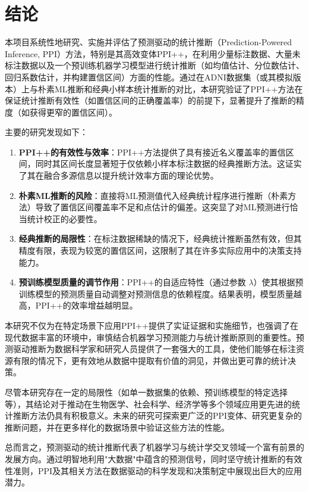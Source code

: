 \documentclass[12pt,a4paper]{article}
\begin{document}
\section{结论}
\label{sec:conclusion}
本项目系统性地研究、实施并评估了预测驱动的统计推断（Prediction-Powered Inference, PPI）方法，特别是其高效变体PPI++，在利用少量标注数据、大量未标注数据以及一个预训练机器学习模型进行统计推断（如均值估计、分位数估计、回归系数估计，并构建置信区间）方面的性能。通过在ADNI数据集（或其模拟版本）上与朴素ML推断和经典小样本统计推断的对比，本研究验证了PPI++方法在保证统计推断有效性（如置信区间的正确覆盖率）的前提下，显著提升了推断的精度（如获得更窄的置信区间）。

主要的研究发现如下：
\begin{enumerate}
    \item \textbf{PPI++的有效性与效率}：PPI++方法提供了具有接近名义覆盖率的置信区间，同时其区间长度显著短于仅依赖小样本标注数据的经典推断方法。这证实了其在融合多源信息以提升统计效率方面的理论优势。
    \item \textbf{朴素ML推断的风险}：直接将ML预测值代入经典统计程序进行推断（朴素方法）导致了置信区间覆盖率不足和点估计的偏差。这突显了对ML预测进行恰当统计校正的必要性。
    \item \textbf{经典推断的局限性}：在标注数据稀缺的情况下，经典统计推断虽然有效，但其精度有限，表现为较宽的置信区间，这限制了其在许多实际应用中的决策支持能力。
    \item \textbf{预训练模型质量的调节作用}：PPI++的自适应特性（通过参数 $\lambda$）使其根据预训练模型的预测质量自动调整对预测信息的依赖程度。结果表明，模型质量越高，PPI++的效率增益越明显。
\end{enumerate}

本研究不仅为在特定场景下应用PPI++提供了实证证据和实施细节，也强调了在现代数据丰富的环境中，审慎结合机器学习预测能力与统计推断原则的重要性。预测驱动推断为数据科学家和研究人员提供了一套强大的工具，使他们能够在标注资源有限的情况下，更有效地从数据中提取有价值的洞见，并做出更可靠的统计决策。

尽管本研究存在一定的局限性（如单一数据集的依赖、预训练模型的特定选择等），其结论对于推动在生物医学、社会科学、经济学等多个领域应用更先进的统计推断方法仍具有积极意义。未来的研究可探索更广泛的PPI变体、研究更复杂的推断问题，并在更多样化的数据场景中验证这些方法的性能。

总而言之，预测驱动的统计推断代表了机器学习与统计学交叉领域一个富有前景的发展方向。通过明智地利用"大数据"中蕴含的预测信号，同时坚守统计推断的有效性准则，PPI及其相关方法在数据驱动的科学发现和决策制定中展现出巨大的应用潜力。
\end{document}
